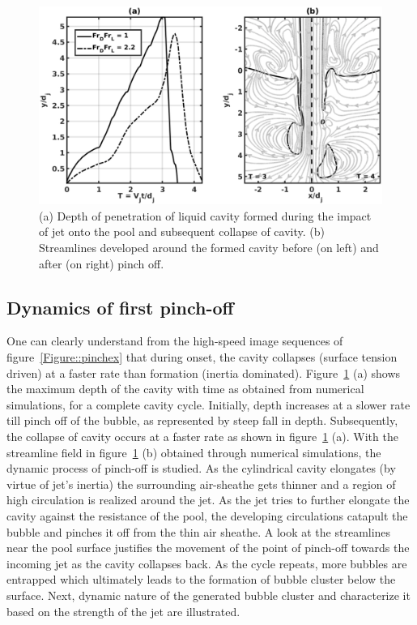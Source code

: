 \begin{figure}
	\centering
	\includegraphics[width=\linewidth]{chapters/jetPool/Figure11}
	\caption{(a) Depth of penetration of liquid cavity formed during the impact of jet onto the pool and subsequent collapse of cavity. (b) Streamlines developed around the formed cavity before (on left) and after (on right) pinch off.}
	\label{Figure::stream}
\end{figure}
\subsection{Dynamics of first pinch-off}
One can clearly understand from the high-speed image sequences of figure~\ref{Figure::pinchex} that during onset, the cavity collapses (surface tension driven) at a faster rate than formation (inertia dominated). Figure~\ref{Figure::stream} (a) shows the maximum depth of the cavity with time as obtained from numerical simulations, for a complete cavity cycle. Initially, depth increases at a slower rate till pinch off of the bubble, as represented by steep fall in depth. Subsequently, the collapse of cavity occurs at a faster rate as shown in figure~\ref{Figure::stream} (a). With the streamline field in figure~\ref{Figure::stream} (b) obtained through numerical simulations, the dynamic process of pinch-off is studied. As the cylindrical cavity elongates (by virtue of jet's inertia) the surrounding air-sheathe gets thinner and a region of high circulation is realized around the jet. As the jet tries to further elongate the cavity against the resistance of the pool, the developing circulations catapult the bubble and pinches it off from the thin air sheathe. A look at the streamlines near the pool surface justifies the movement of the point of pinch-off towards the incoming jet as the cavity collapses back. As the cycle repeats, more bubbles are entrapped which ultimately leads to the formation of bubble cluster below the surface. Next, dynamic nature of the generated bubble cluster and characterize it based on the strength of the jet are illustrated.
